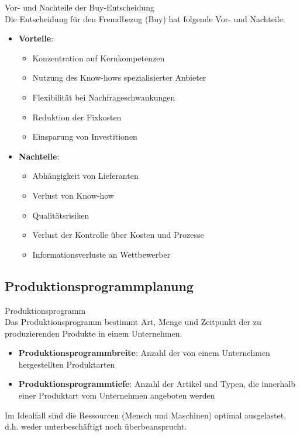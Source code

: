 \begin{concept}{Vor- und Nachteile der Buy-Entscheidung}\\
Die Entscheidung für den Fremdbezug (Buy) hat folgende Vor- und Nachteile:
\begin{itemize}
    \item \textbf{Vorteile}:
    \begin{itemize}
        \item Konzentration auf Kernkompetenzen
        \item Nutzung des Know-hows spezialisierter Anbieter
        \item Flexibilität bei Nachfrageschwankungen
        \item Reduktion der Fixkosten
        \item Einsparung von Investitionen
    \end{itemize}
    \item \textbf{Nachteile}:
    \begin{itemize}
        \item Abhängigkeit von Lieferanten
        \item Verlust von Know-how
        \item Qualitätsrisiken
        \item Verlust der Kontrolle über Kosten und Prozesse
        \item Informationsverluste an Wettbewerber
    \end{itemize}
\end{itemize}
\end{concept}

\subsection{Produktionsprogrammplanung}

\begin{definition}{Produktionsprogramm}\\
Das Produktionsprogramm bestimmt Art, Menge und Zeitpunkt der zu produzierenden Produkte in einem Unternehmen.
\begin{itemize}
    \item \textbf{Produktionsprogrammbreite}: Anzahl der von einem Unternehmen hergestellten Produktarten
    \item \textbf{Produktionsprogrammtiefe}: Anzahl der Artikel und Typen, die innerhalb einer Produktart vom Unternehmen angeboten werden
\end{itemize}

Im Idealfall sind die Ressourcen (Mensch und Maschinen) optimal ausgelastet, d.h. weder unterbeschäftigt noch überbeansprucht.
\end{definition}

